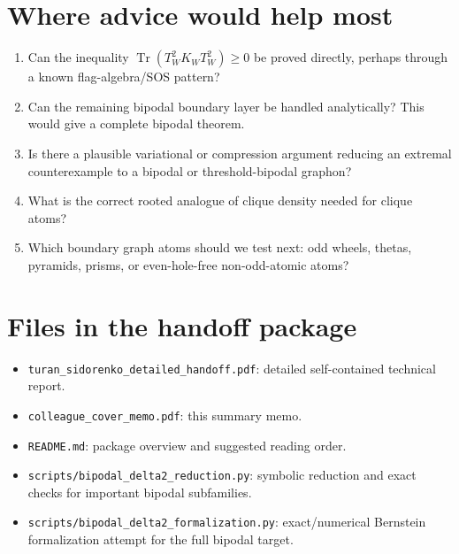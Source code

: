 \documentclass[11pt]{article}
\newcommand{\Tr}{\operatorname{Tr}}
\begin{document}
\section*{Where advice would help most}
\begin{enumerate}[label=\textbf{Q\arabic*.},leftmargin=*]
\item Can the inequality $\Tr(T_W^2K_WT_W^2)\ge0$ be proved directly, perhaps through a known flag-algebra/SOS pattern?
\item Can the remaining bipodal boundary layer be handled analytically?  This would give a complete bipodal theorem.
\item Is there a plausible variational or compression argument reducing an extremal counterexample to a bipodal or threshold-bipodal graphon?
\item What is the correct rooted analogue of clique density needed for clique atoms?
\item Which boundary graph atoms should we test next: odd wheels, thetas, pyramids, prisms, or even-hole-free non-odd-atomic atoms?
\end{enumerate}

\section*{Files in the handoff package}
\begin{itemize}[leftmargin=*]
\item \texttt{turan\_sidorenko\_detailed\_handoff.pdf}: detailed self-contained technical report.
\item \texttt{colleague\_cover\_memo.pdf}: this summary memo.
\item \texttt{README.md}: package overview and suggested reading order.
\item \texttt{scripts/bipodal\_delta2\_reduction.py}: symbolic reduction and exact checks for important bipodal subfamilies.
\item \texttt{scripts/bipodal\_delta2\_formalization.py}: exact/numerical Bernstein formalization attempt for the full bipodal target.
\end{itemize}
\end{document}
